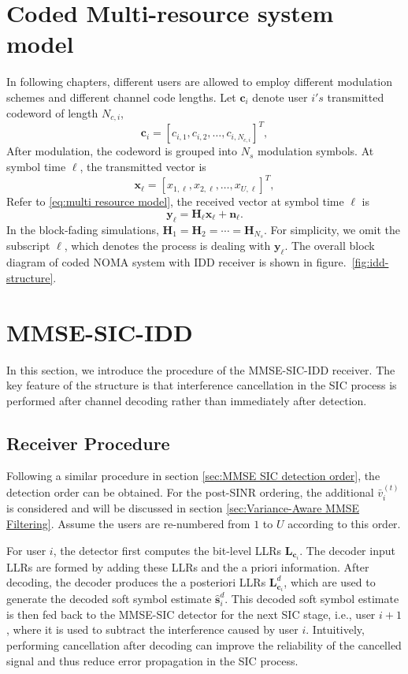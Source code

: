 \section{Coded Multi-resource system model}
In following chapters, different users are allowed to employ different modulation schemes and different channel code lengths.
Let $\bm{c}_i$ denote user $i's$ transmitted codeword of length $N_{c,i}$,
\begin{equation}
    \bm{c}_i=[c_{i,1},c_{i,2},\ldots,c_{i,N_{c,i}}]^T,
\end{equation}
After modulation, the codeword is grouped into $N_{s}$ modulation symbols. At symbol time $\ell$, the transmitted vector is
\begin{equation}
    \bm{x}_\ell=[x_{1,\ell},x_{2,\ell},\ldots,x_{U,\ell}]^T,
\end{equation}
Refer to \eqref{eq:multi resource model}, the received vector at symbol time $\ell$ is
\begin{equation}
    \bm{y}_\ell=\bm{H}_\ell\bm{x}_\ell+\bm{n}_\ell.
    \label{eq:coded-symbol-model}
\end{equation}
In the block-fading simulations, $\bm{H}_1=\bm{H}_2=\cdots=\bm{H}_{N_s}$. For simplicity, we omit the subscript $\ell$, which denotes the process is dealing with $\bm{y_\ell}$. 
The overall block diagram of coded NOMA system with IDD receiver is shown in figure.~\ref{fig:idd-structure}.

\section{MMSE-SIC-IDD}

In this section, we introduce the procedure of the MMSE-SIC-IDD receiver. The key feature of the structure is that interference cancellation in the SIC process is performed after channel decoding rather than immediately after detection.

\subsection{Receiver Procedure}
Following a similar procedure in section \ref{sec:MMSE SIC detection order}, the detection order can be obtained. For the post-SINR ordering, the additional $\bar{v}_i^{(t)}$ is considered and will be discussed in section \ref{sec:Variance-Aware MMSE Filtering}. Assume the users are re-numbered from $1$ to $U$ according to this order. 

For user $i$, the detector first computes the bit-level LLRs $\bm{L}_{\bm{c}_i}$. The decoder input LLRs are formed by adding these LLRs and the a priori information. After decoding, the decoder produces the a posteriori LLRs $\bm{L}^d_{\bm{c}_i}$, which are used to generate the decoded soft symbol estimate $\hat{\bm{s}}^d_i$. This decoded soft symbol estimate is then fed back to the MMSE-SIC detector for the next SIC stage, i.e., user $i+1$, where it is used to subtract the interference caused by user $i$. 
Intuitively, performing cancellation after decoding can improve the reliability of the cancelled signal and thus reduce error propagation in the SIC process.

